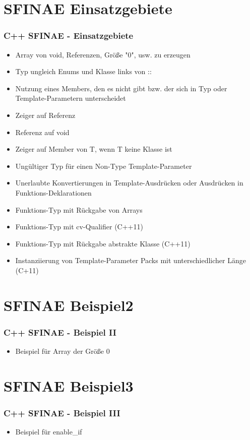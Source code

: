 \documentclass{beamer}
\begin{document}
\section{SFINAE Einsatzgebiete}
\begin{frame}[fragile]
\frametitle{C++ SFINAE - Einsatzgebiete}

\begin{itemize}
\item Array von void, Referenzen, Größe "0", usw. zu erzeugen
\item Typ ungleich Enums und Klasse links von ::
\item Nutzung eines Members, den es nicht gibt bzw. der sich in Typ oder Template-Parametern unterscheidet
\item Zeiger auf Referenz
\item Referenz auf void
\item Zeiger auf Member von T, wenn T keine Klasse ist
\item Ungültiger Typ für einen Non-Type Template-Parameter
\item Unerlaubte Konvertierungen in Template-Ausdrücken oder Ausdrücken in Funktions-Deklarationen
\item Funktions-Typ mit Rückgabe von Arrays
\item Funktions-Typ mit cv-Qualifier (C++11)
\item Funktions-Typ mit Rückgabe abstrakte Klasse (C++11)
\item Instanziierung von Template-Parameter Packs mit unterschiedlicher Länge (C+11)
\end{itemize}
\end{frame}



\section{SFINAE Beispiel2}
\begin{frame}[fragile]
\frametitle{C++ SFINAE - Beispiel II}

\begin{itemize}
\item Beispiel für Array der Größe 0
\end{itemize}
\end{frame}



\section{SFINAE Beispiel3}
\begin{frame}
\frametitle{C++ SFINAE - Beispiel III}

\begin{itemize}
\item Beispiel für enable\_if
\end{itemize}
\end{frame}
\end{document}

